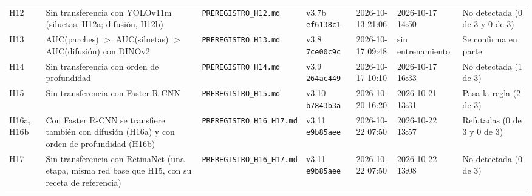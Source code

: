 \begin{table}[H]
{\begin{tabular}{@{}l p{6.3cm} l l l l p{3.2cm}@{}}
H12 & Sin transferencia con YOLOv11m (siluetas, H12a; difusión, H12b) & \texttt{PREREGISTRO\_H12.md} & v3.7b \texttt{ef6138c1} & 2026-10-13 21:06 & 2026-10-17 14:50 & No detectada (0 de 3 y 0 de 3) \\
H13 & AUC(parches) $>$ AUC(siluetas) $>$ AUC(difusión) con DINOv2 & \texttt{PREREGISTRO\_H13.md} & v3.8 \texttt{7ce00c9c} & 2026-10-17 09:48 & sin entrenamiento & Se confirma en parte \\
H14 & Sin transferencia con orden de profundidad & \texttt{PREREGISTRO\_H14.md} & v3.9 \texttt{264ac449} & 2026-10-17 10:10 & 2026-10-17 16:33 & No detectada (1 de 3) \\
H15 & Sin transferencia con Faster R-CNN & \texttt{PREREGISTRO\_H15.md} & v3.10 \texttt{b7843b3a} & 2026-10-20 16:20 & 2026-10-21 13:31 & Pasa la regla (2 de 3) \\
H16a, H16b & Con Faster R-CNN se transfiere también con difusión (H16a) y con orden de profundidad (H16b) & \texttt{PREREGISTRO\_H16\_H17.md} & v3.11 \texttt{e9b85aee} & 2026-10-22 07:50 & 2026-10-22 13:57 & Refutadas (0 de 3 y 0 de 3) \\
H17 & Sin transferencia con RetinaNet (una etapa, misma red base que H15, con su receta de referencia) & \texttt{PREREGISTRO\_H16\_H17.md} & v3.11 \texttt{e9b85aee} & 2026-10-22 07:50 & 2026-10-22 13:08 & No detectada (0 de 3) \\
\bottomrule\end{tabular}}\end{table}
